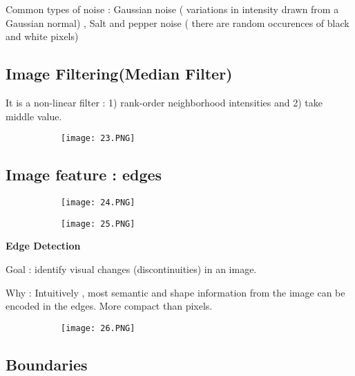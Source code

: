 \documentclass{article}
\begin{document}
Common types of noise : Gaussian noise ( variations in intensity drawn from a Gaussian normal) , Salt and pepper noise ( there are random occurences of black and white pixels)

\subsection{Image Filtering(Median Filter)}

It is a non-linear filter : 1) rank-order neighborhood intensities and 2) take middle value.

\begin{figure}[ht!]
  \centering
  \begin{subfigure}[b]{0.4\linewidth}
    \texttt{[image: 23.PNG]}
  \end{subfigure}
\end{figure}

\subsection{Image feature : edges}

\begin{figure}[ht!]
  \centering
  \begin{subfigure}[b]{0.4\linewidth}
    \texttt{[image: 24.PNG]}
  \end{subfigure}
  \begin{subfigure}[b]{0.4\textwidth}
         \centering
         \texttt{[image: 25.PNG]}
     \end{subfigure}
\end{figure}


\textbf{Edge Detection}
\vspace{3mm}

Goal : identify visual changes (discontinuities) in an image.

Why : Intuitively , most semantic and shape information from the image can be encoded in the edges. More compact than pixels.

\begin{figure}[ht!]
  \centering
  \begin{subfigure}[b]{0.4\linewidth}
    \texttt{[image: 26.PNG]}
  \end{subfigure}
\end{figure}

\subsection{Boundaries}
\end{document}
